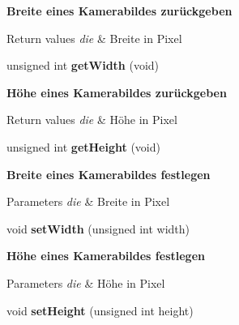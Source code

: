 \begin{Indent}{\bf Breite eines Kamerabildes zurückgeben}\par
{\em 
\begin{DoxyRetVals}{Return values}
{\em die} & Breite in Pixel \\
\hline
\end{DoxyRetVals}
}\begin{DoxyCompactItemize}
\item 
\hypertarget{classrc_1_1Camera_a1260f90780be36eb52db9f90d73578e9}{unsigned int {\bfseries get\+Width} (void)}\label{classrc_1_1Camera_a1260f90780be36eb52db9f90d73578e9}

\end{DoxyCompactItemize}
\end{Indent}
\begin{Indent}{\bf Höhe eines Kamerabildes zurückgeben}\par
{\em 
\begin{DoxyRetVals}{Return values}
{\em die} & Höhe in Pixel \\
\hline
\end{DoxyRetVals}
}\begin{DoxyCompactItemize}
\item 
\hypertarget{classrc_1_1Camera_a3a279a087aa5864793aa9c5628bea40a}{unsigned int {\bfseries get\+Height} (void)}\label{classrc_1_1Camera_a3a279a087aa5864793aa9c5628bea40a}

\end{DoxyCompactItemize}
\end{Indent}
\begin{Indent}{\bf Breite eines Kamerabildes festlegen}\par
{\em 
\begin{DoxyParams}{Parameters}
{\em die} & Breite in Pixel \\
\hline
\end{DoxyParams}
}\begin{DoxyCompactItemize}
\item 
\hypertarget{classrc_1_1Camera_a7f45f935fa50f95f78d1d2a3629f2a91}{void {\bfseries set\+Width} (unsigned int width)}\label{classrc_1_1Camera_a7f45f935fa50f95f78d1d2a3629f2a91}

\end{DoxyCompactItemize}
\end{Indent}
\begin{Indent}{\bf Höhe eines Kamerabildes festlegen}\par
{\em 
\begin{DoxyParams}{Parameters}
{\em die} & Höhe in Pixel \\
\hline
\end{DoxyParams}
}\begin{DoxyCompactItemize}
\item 
\hypertarget{classrc_1_1Camera_aeea452211d9fec8761c6aaa7bbb6d5ea}{void {\bfseries set\+Height} (unsigned int height)}\label{classrc_1_1Camera_aeea452211d9fec8761c6aaa7bbb6d5ea}

\end{DoxyCompactItemize}
\end{Indent}

